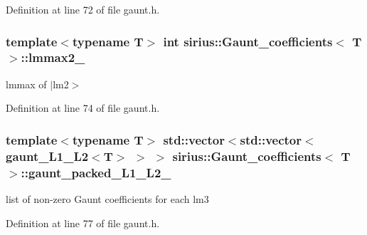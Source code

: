 Definition at line 72 of file gaunt.\+h.

\hypertarget{classsirius_1_1_gaunt__coefficients_a428fcaf6fa20fb79f487b7abfd648b04}{}
\subsubsection[{lmmax2\+\_\+}]{\setlength{\rightskip}{0pt plus 5cm}template$<$typename T$>$ int {\bf sirius\+::\+Gaunt\+\_\+coefficients}$<$ T $>$\+::lmmax2\+\_\+\hspace{0.3cm}{\ttfamily [private]}}\label{classsirius_1_1_gaunt__coefficients_a428fcaf6fa20fb79f487b7abfd648b04}


lmmax of $\vert$lm2$>$ 



Definition at line 74 of file gaunt.\+h.

\hypertarget{classsirius_1_1_gaunt__coefficients_a8874c91c944a9f77963b0bc6c0d93e0f}{}
\subsubsection[{gaunt\+\_\+packed\+\_\+\+L1\+\_\+\+L2\+\_\+}]{\setlength{\rightskip}{0pt plus 5cm}template$<$typename T$>$ std\+::vector$<$std\+::vector$<${\bf gaunt\+\_\+\+L1\+\_\+\+L2}$<$T$>$ $>$ $>$ {\bf sirius\+::\+Gaunt\+\_\+coefficients}$<$ T $>$\+::gaunt\+\_\+packed\+\_\+\+L1\+\_\+\+L2\+\_\+\hspace{0.3cm}{\ttfamily [private]}}\label{classsirius_1_1_gaunt__coefficients_a8874c91c944a9f77963b0bc6c0d93e0f}


list of non-\/zero Gaunt coefficients for each lm3 



Definition at line 77 of file gaunt.\+h.

\hypertarget{classsirius_1_1_gaunt__coefficients_ae81678a8f6226e3f1d92037ad5f2e1ad}{}
